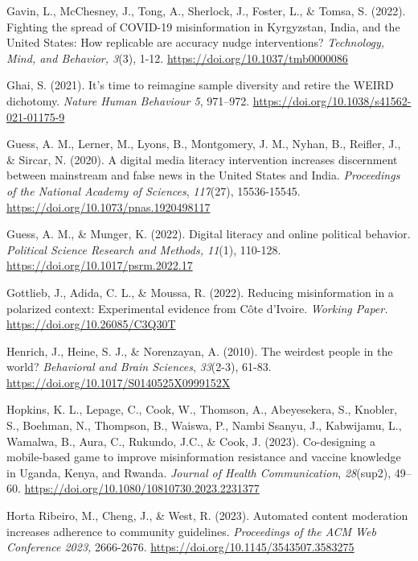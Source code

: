 \documentclass[authordate, reflection]{jote-new-article}
\begin{document}
	Gavin, L., McChesney, J., Tong, A., Sherlock, J., Foster, L., \& Tomsa, S. (2022). Fighting the spread of COVID-19 misinformation in Kyrgyzstan, India, and the United States: How replicable are accuracy nudge interventions? \emph{Technology, Mind, and Behavior, 3}(3), 1-12. \url{https://doi.org/10.1037/tmb0000086}



	Ghai, S. (2021). It's time to reimagine sample diversity and retire the WEIRD dichotomy. \emph{Nature Human Behaviour 5}, 971--972. \url{https://doi.org/10.1038/s41562-021-01175-9}



	Guess, A. M., Lerner, M., Lyons, B., Montgomery, J. M., Nyhan, B., Reifler, J., \& Sircar, N. (2020). A digital media literacy intervention increases discernment between mainstream and false news in the United States and India. \emph{Proceedings of the National Academy of Sciences}, \emph{117}(27), 15536-15545. \url{https://doi.org/10.1073/pnas.1920498117}



	Guess, A. M., \& Munger, K. (2022). Digital literacy and online political behavior. \emph{Political Science Research and Methods, 11}(1), 110-128. \url{https://doi.org/10.1017/psrm.2022.17}



	Gottlieb, J., Adida, C. L., \& Moussa, R. (2022). Reducing misinformation in a polarized context: Experimental evidence from Côte d'Ivoire. \emph{Working Paper.} \url{https://doi.org/10.26085/C3Q30T}



	Henrich, J., Heine, S. J., \& Norenzayan, A. (2010). The weirdest people in the world? \emph{Behavioral and Brain Sciences}, \emph{33}(2-3), 61-83. \url{https://doi.org/10.1017/S0140525X0999152X}



	Hopkins, K. L., Lepage, C., Cook, W., Thomson, A., Abeyesekera, S., Knobler, S., Boehman, N., Thompson, B., Waiswa, P., Nambi Ssanyu, J., Kabwijamu, L., Wamalwa, B., Aura, C., Rukundo, J.C., \& Cook, J. (2023). Co-designing a mobile-based game to improve misinformation resistance and vaccine knowledge in Uganda, Kenya, and Rwanda. \emph{Journal of Health Communication}, \emph{28}(sup2), 49--60. \url{https://doi.org/10.1080/10810730.2023.2231377}



	Horta Ribeiro, M., Cheng, J., \& West, R. (2023). Automated content moderation increases adherence to community guidelines. \emph{Proceedings of the ACM Web Conference 2023,} 2666-2676. \url{https://doi.org/10.1145/3543507.3583275}
\end{document}
